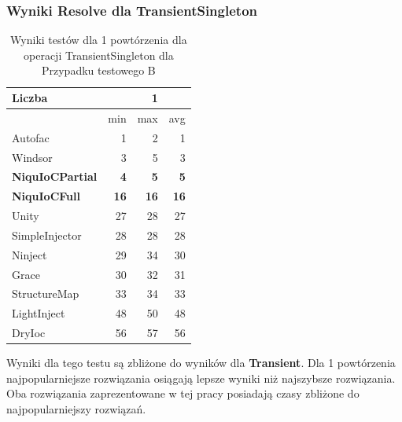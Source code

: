 \documentclass[12pt]{article}
\begin{document}
\subsubsection{Wyniki Resolve dla TransientSingleton}
\begin{table}[H]
\captionsetup{belowskip=0pt,aboveskip=0pt}
\begin{center}
\begin{small}
	\begin{tabular}{ | l | r r r | }
    		\hline
Liczba & & 1 & \\ \hline
 & min & max & avg \\ \hline
Autofac & 1 & 2 & 1 \\ \hline
Windsor & 3 & 5 & 3 \\ \hline
\textbf{NiquIoCPartial} & \textbf{4} & \textbf{5} & \textbf{5} \\ \hline
\textbf{NiquIoCFull} & \textbf{16} & \textbf{16} & \textbf{16} \\ \hline
Unity & 27 & 28 & 27 \\ \hline
SimpleInjector & 28 & 28 & 28 \\ \hline
Ninject & 29 & 34 & 30 \\ \hline
Grace & 30 & 32 & 31 \\ \hline
StructureMap & 33 & 34 & 33 \\ \hline
LightInject & 48 & 50 & 48 \\ \hline
DryIoc & 56 & 57 & 56 \\ \hline
  	\end{tabular}
\end{small}
\end{center}
\caption{Wyniki testów dla 1 powtórzenia dla operacji TransientSingleton dla Przypadku testowego B}
\label{TestCaseB_TransientSingleton1}
\end{table}
Wyniki dla tego testu są zbliżone do wyników dla \textbf{Transient}. Dla 1 powtórzenia najpopularniejsze rozwiązania osiągają lepsze wyniki niż najszybsze rozwiązania. Oba rozwiązania zaprezentowane w tej pracy posiadają czasy zbliżone do najpopularniejszy rozwiązań.
\\ \\
\end{document}
